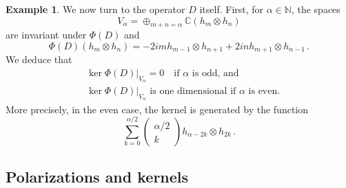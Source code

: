 \documentclass{amsart}[draft,11pt]
\numberwithin{equation}{section}
\theoremstyle{definition}
\newtheorem{example}[theorem]{Example}
\begin{document}
\begin{example}
We now turn to the operator $D$ itself. First, for $\alpha \in \mathbb{N}$, the spaces 
$$
V_\alpha = \oplus_{m+n=\alpha} \mathbb{C}(h_m\otimes h_n)
$$
are invariant under $\Phi(D)$ and
$$ \Phi(D)(h_m\otimes h_n)=-2imh_{m-1}\otimes h_{n+1}+2inh_{m+1}\otimes h_{n-1}\,.$$
We deduce that 
\begin{align*}
&\ker \Phi(D)|_{V_\alpha}=0 
\quad\text{if }\alpha\text{ is odd, and }\\
&\ker \Phi(D)|_{V_\alpha}
\text{ is one dimensional if }\alpha\text{ is even}.   
\end{align*} 
More precisely, in the even case, the kernel is generated by the function 
$$
\sum_{k=0}^{\alpha/2} 
\left(\begin{array}{c}\alpha/2 \\ k\end{array}\right)
h_{\alpha-2k}\otimes h_{2k}\,.
$$ 
\end{example}

\subsection{Polarizations and kernels}
\label{invpolker}
\end{document}
